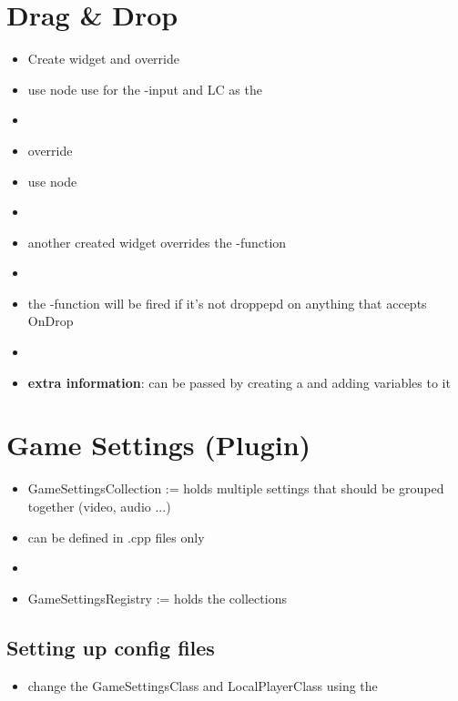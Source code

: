             
            
    
    \section{Drag \& Drop}
        \begin{itemize}
            \item Create widget and override 
            \item use node  use  for the -input and LC as the 
            \item  
            \item override 
            \item use node 
            \item 
            \item another created widget overrides the -function
            \item 
            \item the -function will be fired if it's not droppepd on anything that accepts OnDrop
            \item 
            \item \textbf{extra information}: can be passed by creating a  and adding variables to it
        \end{itemize}

            
    \section{Game Settings (Plugin)}            
        \begin{itemize}
            \item GameSettingsCollection := holds multiple settings that should be grouped together (video, audio ...)
            \item can be defined in .cpp files only
            \item 
            \item GameSettingsRegistry := holds the collections
        \end{itemize}

        \subsection{Setting up config files}
            \begin{itemize}
                \item change the GameSettingsClass and LocalPlayerClass using the 
            \end{itemize}
            

